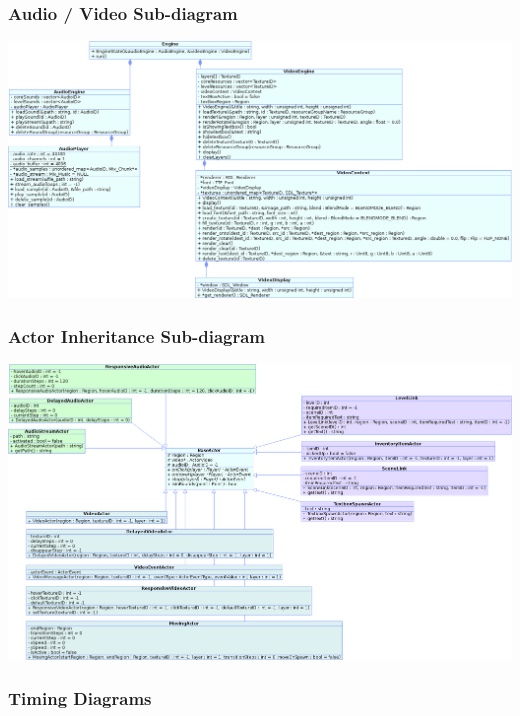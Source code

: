 \documentclass{article}
\begin{document}
    \subsubsection{Audio / Video Sub-diagram}
      \begin{center}
				\includegraphics[scale=0.50,angle=90]{AudioVideoClasses.png}
      \end{center}
		\subsubsection{Actor Inheritance Sub-diagram}
			\begin{center}
				\includegraphics[scale=0.51,angle=90]{Actors.png}
			\end{center}
		\subsubsection{Timing Diagrams}
\end{document}
